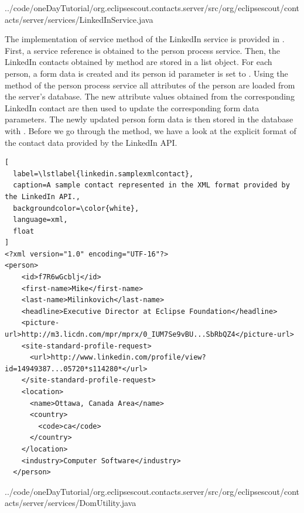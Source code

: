 \documentclass[a4paper,10pt,twoside]{book}
\begin{document}

{../code/oneDayTutorial/org.eclipsescout.contacts.server/src/org/eclipsescout/contacts/server/services/LinkedInService.java}

The implementation of service method  of the LinkedIn service is provided in .
First, a service reference is obtained to the person process service. 
Then, the LinkedIn contacts obtained by method  are stored in a  list object. 
For each person, a form data is created and its person id parameter is set to . 
Using the  method of the person process service all attributes of the person are loaded from the server's database. 
The new attribute values obtained from the corresponding LinkedIn contact are then used to update the corresponding form data parameters. 
The newly updated person form data is then stored in the database with .
Before we go through the  method, we have a look at the explicit format of the contact data provided by the LinkedIn API. 

\begin{lstlisting}[
  label=\lstlabel{linkedin.samplexmlcontact},
  caption=A sample contact represented in the XML format provided by the LinkedIn API.,
  backgroundcolor=\color{white},
  language=xml,
  float
]
<?xml version="1.0" encoding="UTF-16"?>
<person>
    <id>f7R6wGcblj</id>
    <first-name>Mike</first-name>
    <last-name>Milinkovich</last-name>
    <headline>Executive Director at Eclipse Foundation</headline>
    <picture-url>http://m3.licdn.com/mpr/mprx/0_IUM7Se9vBU...SbRbQZ4</picture-url>
    <site-standard-profile-request>
      <url>http://www.linkedin.com/profile/view?id=14949387...05720*s114280*</url>
    </site-standard-profile-request>
    <location>
      <name>Ottawa, Canada Area</name>
      <country>
        <code>ca</code>
      </country>
    </location>
    <industry>Computer Software</industry>
  </person>
\end{lstlisting}


{../code/oneDayTutorial/org.eclipsescout.contacts.server/src/org/eclipsescout/contacts/server/services/DomUtility.java}
\end{document}
